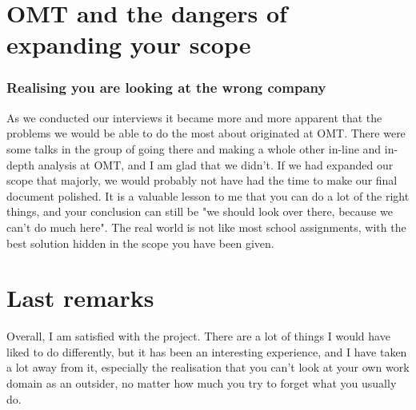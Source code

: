 
\section*{OMT and the dangers of expanding your scope}
\subsubsection{Realising you are looking at the wrong company}
As we conducted our interviews it became more and more apparent that the problems we would be able to do the most about originated at OMT. There were some talks in the group of going there and making a whole other in-line and in-depth analysis at OMT, and I am glad that we didn't. If we had expanded our scope that majorly, we would probably not have had the time to make our final document polished. 
It is a valuable lesson to me that you can do a lot of the right things, and your conclusion can still be "we should look over there, because we can't do much here". The real world is not like most school assignments, with the best solution hidden in the scope you have been given. 

\section*{Last remarks}
Overall, I am satisfied with the project. There are a lot of things I would have liked to do differently, but it has been an interesting experience, and I have taken a lot away from it, especially the realisation that you can't look at your own work domain as an outsider, no matter how much you try to forget what you usually do.